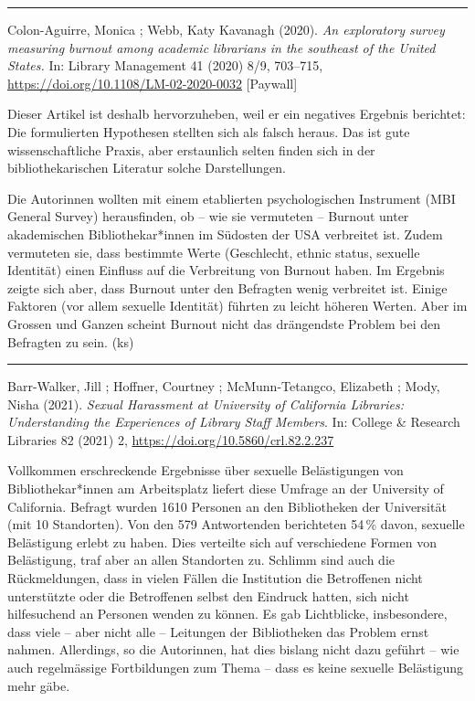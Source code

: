 \documentclass[a4paper,
fontsize=11pt,
oneside,
numbers=noperiodatend,
parskip=half-,
bibliography=totoc,
final
]{scrartcl}
\begin{document}
\begin{center}\rule{0.5\linewidth}{0.5pt}\end{center}

Colon-Aguirre, Monica ; Webb, Katy Kavanagh (2020). \emph{An exploratory
survey measuring burnout among academic librarians in the southeast of
the United States.} In: Library Management 41 (2020) 8/9, 703--715,
\url{https://doi.org/10.1108/LM-02-2020-0032} {[}Paywall{]}

Dieser Artikel ist deshalb hervorzuheben, weil er ein negatives Ergebnis
berichtet: Die formulierten Hypothesen stellten sich als falsch heraus.
Das ist gute wissenschaftliche Praxis, aber erstaunlich selten finden
sich in der bibliothekarischen Literatur solche Darstellungen.

Die Autorinnen wollten mit einem etablierten psychologischen Instrument
(MBI General Survey) herausfinden, ob -- wie sie vermuteten -- Burnout
unter akademischen Bibliothekar*innen im Südosten der USA verbreitet
ist. Zudem vermuteten sie, dass bestimmte Werte (Geschlecht, ethnic
status, sexuelle Identität) einen Einfluss auf die Verbreitung von
Burnout haben. Im Ergebnis zeigte sich aber, dass Burnout unter den
Befragten wenig verbreitet ist. Einige Faktoren (vor allem sexuelle
Identität) führten zu leicht höheren Werten. Aber im Grossen und Ganzen
scheint Burnout nicht das drängendste Problem bei den Befragten zu sein.
(ks)

\begin{center}\rule{0.5\linewidth}{0.5pt}\end{center}

Barr-Walker, Jill ; Hoffner, Courtney ; McMunn-Tetangco, Elizabeth ;
Mody, Nisha (2021). \emph{Sexual Harassment at University of California
Libraries: Understanding the Experiences of Library Staff Members}. In:
College \& Research Libraries 82 (2021) 2,
\url{https://doi.org/10.5860/crl.82.2.237}

Vollkommen erschreckende Ergebnisse über sexuelle Belästigungen von
Bibliothekar*innen am Arbeitsplatz liefert diese Umfrage an der
University of California. Befragt wurden 1610 Personen an den
Bibliotheken der Universität (mit 10 Standorten). Von den 579
Antwortenden berichteten 54\,\% davon, sexuelle Belästigung erlebt zu
haben. Dies verteilte sich auf verschiedene Formen von Belästigung, traf
aber an allen Standorten zu. Schlimm sind auch die Rückmeldungen, dass
in vielen Fällen die Institution die Betroffenen nicht unterstützte oder
die Betroffenen selbst den Eindruck hatten, sich nicht hilfesuchend an
Personen wenden zu können. Es gab Lichtblicke, insbesondere, dass viele
-- aber nicht alle -- Leitungen der Bibliotheken das Problem ernst
nahmen. Allerdings, so die Autorinnen, hat dies bislang nicht dazu
geführt -- wie auch regelmässige Fortbildungen zum Thema -- dass es
keine sexuelle Belästigung mehr gäbe.
\end{document}
